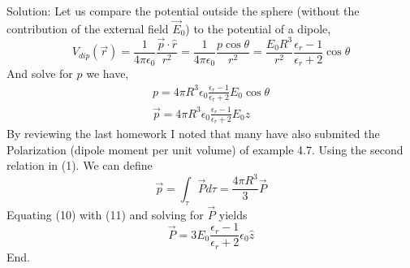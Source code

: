 Solution: Let us compare the potential outside the sphere (without the contribution of the external field $\vec{E}_0$) to the potential of a dipole, 
\begin{equation}
	V_{dip}(\vec{r}) = \frac{1}{4\pi \epsilon_0}\frac{\vec{p}\cdot\hat{r}}{r^2} 
									= \frac{1}{4\pi \epsilon_0}\frac{p\cos\theta}{r^2} 
									=\frac{E_0R^3}{r^2}\frac{\epsilon_r-1}{\epsilon_r+2}\cos\theta
\end{equation}
And solve for $p$ we have,
\begin{align}
	p = 4\pi R^3\epsilon_0 \frac{\epsilon_r-1}{\epsilon_r+2} E_0\cos\theta \\
	\vec{p} = 4\pi R^3\epsilon_0 \frac{\epsilon_r-1}{\epsilon_r+2} E_0 \hat{z}
\end{align}
By reviewing the last homework I noted that many have also submited the Polarization (dipole moment per unit volume) of example 4.7. 
Using the second relation in (1). We can define
\begin{equation}
	\vec{p} = \int_{\tau}\vec{P}d\tau = \frac{4\pi R^3}{3}\vec{P}
\end{equation}
Equating (10) with (11) and solving for $\vec{P}$ yields
\begin{equation}
	\vec{P} = 3E_0\frac{\epsilon_r-1}{\epsilon_r+2}\epsilon_0 \hat{z}
\end{equation}
End.


